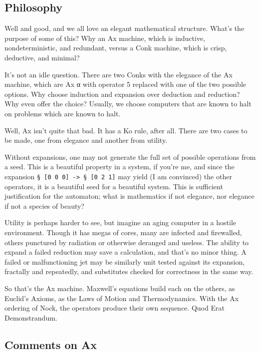 \documentclass[twoside]{article}
\begin{document}
\subsection{Philosophy}

Well and good, and we all love an elegant mathematical structure. What's the purpose of some of this? Why an Ax machine, which is inductive, nondeterministic, and redundant, versus a Conk machine, which is crisp, deductive, and minimal?

It's not an idle question. There are two Conks with the elegance of the Ax machine, which are Ax α with operator 5 replaced with one of the two possible options. Why choose induction and expansion over deduction and reduction? Why even offer the choice? Usually, we choose computers that are known to halt on problems which are known to halt. 

Well, Ax isn't quite that bad. It has a Ko rule, after all. There are two cases to be made, one from elegance and another from utility.

Without expansions, one may not generate the full set of possible operations from a seed. This is a beautiful property in a system, if you're me, and since the expansion \texttt{§ [0 0 0] -> § [0 2 1]} may yield (I am convinced) the other operators, it is a beautiful seed for a beautiful system. This is sufficient justification for the automaton; what is mathematics if not elegance, nor elegance if not a species of beauty?

Utility is perhaps harder to see, but imagine an aging computer in a hostile environment. Though it has megas of cores, many are infected and firewalled, others punctured by radiation or otherwise deranged and useless. The ability to expand a failed reduction may save a calculation, and that's no minor thing. A failed or malfunctioning jet may be similarly unit tested against its expansion, fractally and repeatedly, and substitutes checked for correctness in the same way. 

So that's the Ax machine. Maxwell's equations build each on the others, as Euclid's Axioms, as the Laws of Motion and Thermodynamics. With the Ax ordering of Nock, the operators produce their own sequence. Quod Erat Demonstrandum.

\subsection{Comments on Ax}
\end{document}

